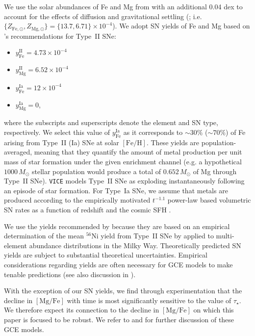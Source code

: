\documentclass[linenumbers, twocolumn]{aastex631}
\newcommand{\Msun}{\ensuremath{M_{\odot}}}
\newcommand{\FeH}{\ensuremath{[\textrm{Fe}/\textrm{H}]}}
\newcommand{\MgFe}{\ensuremath{[\textrm{Mg}/\textrm{Fe}]}}
\begin{document}
We use the solar abundances of Fe and Mg from \citet{Magg2022} with an additional 0.04 dex to account for the effects of diffusion and gravitational settling (\citealt{Turcotte1998}; i.e. $\{Z_{\text{Fe},\odot}, Z_{\text{Mg},\odot}\} = \{13.7, 6.71\} \times 10^{-4}$). We adopt SN yields of Fe and Mg based on \citeauthor{Weinberg2023}'s \citeyearpar{Weinberg2023} recommendations for Type~II SNe:
\begin{itemize}

	\item $y_\text{Fe}^\text{II} = 4.73 \times 10^{-4}$

	\item $y_\text{Mg}^\text{II} = 6.52 \times 10^{-4}$

	\item $y_\text{Fe}^\text{Ia} = 12 \times 10^{-4}$

	\item $y_\text{Mg}^\text{Ia} = 0$,

\end{itemize}
where the subscripts and superscripts denote the element and SN type, respectively. We select this value of $y_\text{Fe}^\text{Ia}$ as it corresponds to $\sim30\%$ ($\sim70\%$) of Fe arising from Type~II (Ia) SNe at solar \FeH{}. These yields are population-averaged, meaning that they quantify the amount of metal production per unit mass of star formation under the given enrichment channel (e.g. a hypothetical $1000\,\Msun$ stellar population would produce a total of $0.652\,\Msun$ of Mg through Type~II SNe). {\tt VICE} models Type~II SNe as exploding instantaneously following an episode of star formation. For Type~Ia SNe, we assume that metals are produced according to the empirically motivated $t^{-1.1}$ power-law based volumetric SN rates as a function of redshift and the cosmic SFH \citep[e.g.][]{Maoz2012}.

We use the yields recommended by \citet{Weinberg2023} because they are based on an empirical determination of the mean $^{56}$Ni yield from Type~II SNe by \citet{Rodriguez2021, Rodriguez2023} applied to multi-element abundance distributions in the Milky Way. Theoretically predicted SN yields \citep[e.g.][]{Seitenzahl2013, Sukhbold2016, Limongi2018, Gronow2021} are subject to substantial theoretical uncertainties. Empirical considerations regarding yields are often necessary for GCE models to make tenable predictions (see also discussion in \citealt{Palla2022}).

With the exception of our SN yields, we find through experimentation that the decline in \MgFe{} with time is most significantly sensitive to the value of $\tau_\star$. We therefore expect its connection to the decline in \MgFe{} on which this paper is focused to be robust. We refer to \citet{Johnson2020} and \citet{2022arXiv220402989C} for further discussion of these GCE models.
\end{document}
